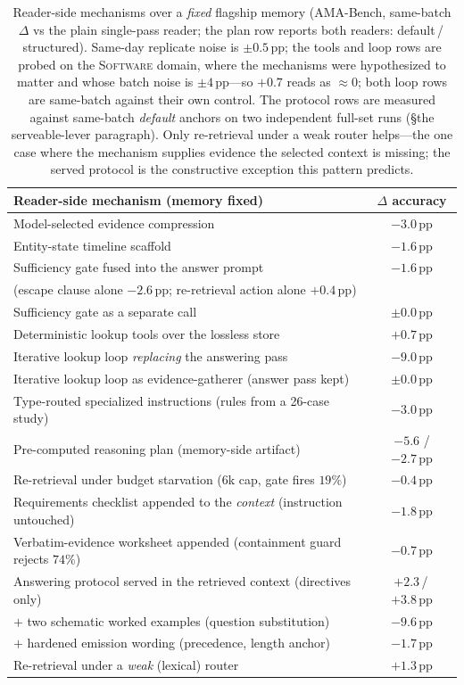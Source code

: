 \documentclass{article} %
\newcommand{\pp}{\,\mathrm{pp}}
\begin{document}
\begin{table}[h]
\centering
\caption{Reader-side mechanisms over a \emph{fixed} flagship memory (AMA-Bench,
same-batch $\Delta$ vs the plain single-pass reader; the plan row reports both
readers: default\,/\,structured). Same-day replicate noise is $\pm0.5\pp$; the
tools and loop rows are probed on the \textsc{Software} domain, where the
mechanisms were hypothesized to matter and whose batch noise is
$\pm4\pp$---so $+0.7$ reads as $\approx\!0$; both loop rows are same-batch
against their own control. The protocol rows are measured against same-batch
\emph{default} anchors on two independent full-set runs (\S the serveable-lever
paragraph). Only re-retrieval under a weak router helps---the
one case where the mechanism supplies evidence the selected context is
missing; the served protocol is the constructive exception this pattern predicts.}
\label{tab:reader}
\small
\begin{tabular}{lc}
\toprule
Reader-side mechanism (memory fixed) & $\Delta$ accuracy \\
\midrule
Model-selected evidence compression & $-3.0\pp$ \\
Entity-state timeline scaffold & $-1.6\pp$ \\
Sufficiency gate fused into the answer prompt & $-1.6\pp$ \\
\quad(escape clause alone $-2.6\pp$; re-retrieval action alone $+0.4\pp$) & \\
Sufficiency gate as a separate call & $\pm0.0\pp$ \\
Deterministic lookup tools over the lossless store & $+0.7\pp$ \\
Iterative lookup loop \emph{replacing} the answering pass & $-9.0\pp$ \\
Iterative lookup loop as evidence-gatherer (answer pass kept) & $\pm0.0\pp$ \\
Type-routed specialized instructions (rules from a 26-case study) & $-3.0\pp$ \\
Pre-computed reasoning plan (memory-side artifact) & $-5.6$ / $-2.7\pp$ \\
Re-retrieval under budget starvation (6k cap, gate fires $19\%$) & $-0.4\pp$ \\
\midrule
Requirements checklist appended to the \emph{context} (instruction untouched) & $-1.8\pp$ \\
Verbatim-evidence worksheet appended (containment guard rejects $74\%$) & $-0.7\pp$ \\
\midrule
Answering protocol served in the retrieved context (directives only) & $+2.3$\,/\,$+3.8\pp$ \\
\quad$+$ two schematic worked examples (question substitution) & $-9.6\pp$ \\
\quad$+$ hardened emission wording (precedence, length anchor) & $-1.7\pp$ \\
\midrule
Re-retrieval under a \emph{weak} (lexical) router & $+1.3\pp$ \\
\bottomrule
\end{tabular}
\end{table}
\end{document}

